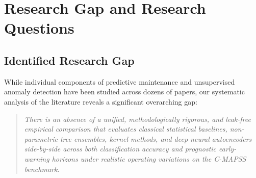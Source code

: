\documentclass[12pt,a4paper,oneside]{report}
\begin{document}
\chapter{Research Gap and Research Questions}

\section{Identified Research Gap}
While individual components of predictive maintenance and unsupervised anomaly detection have been studied across dozens of papers, our systematic analysis of the literature reveals a significant overarching gap:

\begin{quote}
\textit{There is an absence of a unified, methodologically rigorous, and leak-free empirical comparison that evaluates classical statistical baselines, non-parametric tree ensembles, kernel methods, and deep neural autoencoders side-by-side across both classification accuracy and prognostic early-warning horizons under realistic operating variations on the C-MAPSS benchmark.}
\end{quote}
\end{document}
